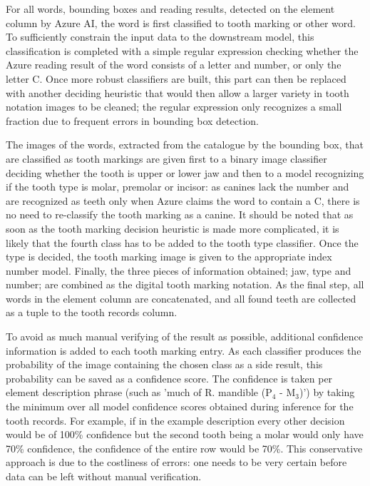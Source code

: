 \documentclass{article}
\begin{document}
For all words, bounding boxes and reading results, detected on the element column by Azure AI, the word is first classified to tooth marking or other word.
To sufficiently constrain the input data to the downstream model, this classification is completed 
with a simple regular expression checking whether the Azure reading result of the word consists of a letter and number, or only the 
letter C. Once more robust classifiers are built, this part can then be replaced with another deciding 
heuristic that would then allow a larger variety in tooth notation images to be cleaned; the regular expression 
only recognizes a small fraction due to frequent errors in bounding box detection.

The images of the words, extracted from the catalogue by the bounding box, that are classified as tooth markings are given first to a binary image classifier deciding whether the tooth 
is upper or lower jaw and then to a model recognizing if the tooth type is molar, premolar or incisor: as 
canines lack the number and are recognized as teeth only when Azure claims the word to contain a C, there is 
no need to re-classify the tooth marking as a canine. It should be noted that as soon as the tooth marking decision 
heuristic is made more complicated, it is likely that the fourth class has to be added to the tooth type classifier.
Once the type is decided, the tooth marking image is given to the appropriate index number model. Finally, 
the three pieces of information obtained; jaw, type and number; are combined as the digital tooth marking 
notation. As the final step, all words in the element column are concatenated, and all found teeth are 
collected as a tuple to the tooth records column.

To avoid as much manual verifying of the result as possible, additional confidence information is added 
to each tooth marking entry. As each classifier produces the probability of the image containing the 
chosen class as a side result, this probability can be saved as a confidence score. The confidence is taken 
per element description phrase (such as 'much of R. mandible ($\text{P}_4$ - $\text{M}_3$)') by taking the minimum over all 
model confidence scores obtained during inference for the tooth records. For example, if in the 
example description every other decision would be of 100\% confidence but the second tooth being a molar 
would only have 70\% confidence, the confidence of the entire row would be 70\%. This conservative approach is 
due to the costliness of errors: one needs to be very certain before data can be left without manual 
verification.
\end{document}
